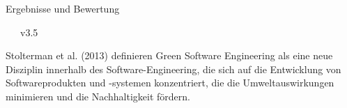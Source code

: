 \documentclass[10pt,aspectratio=169]{beamer}
\begin{document}
\begin{frame}{Ergebnisse und Bewertung}
\begin{minipage}{0.05\linewidth}
\begin{figure}[!ht]
        \end{figure}
        \vspace{-2mm}
        ~~~v3.5
        \vspace{2.5cm}
\end{minipage}
\begin{minipage}{0.43\linewidth}
    \small
    \begin{framed}
    Stolterman et al. (2013) definieren Green Software Engineering als eine neue Disziplin innerhalb des Software-Engineering, die sich auf die Entwicklung von Softwareprodukten und -systemen konzentriert, die die Umweltauswirkungen minimieren und die Nachhaltigkeit fördern.
    \end{framed}
\end{minipage}
\end{frame}
\end{document}
